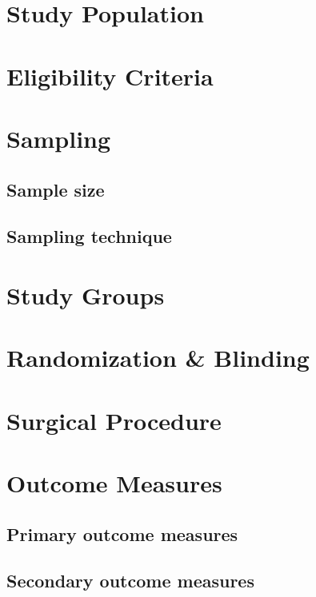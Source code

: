 \documentclass[
  12pt,
  letterpaper,
]{scrreprt}
\begin{document}
\section{Study Population}\label{study-population}

\section{Eligibility Criteria}\label{eligibility-criteria}

\section{Sampling}\label{sampling}

\subsection{Sample size}\label{sample-size}

\subsection{Sampling technique}\label{sampling-technique}

\section{Study Groups}\label{study-groups}

\section{Randomization \& Blinding}\label{randomization-blinding}

\section{Surgical Procedure}\label{surgical-procedure}

\section{Outcome Measures}\label{outcome-measures}

\subsection{Primary outcome measures}\label{primary-outcome-measures}

\subsection{Secondary outcome
measures}\label{secondary-outcome-measures}
\end{document}
